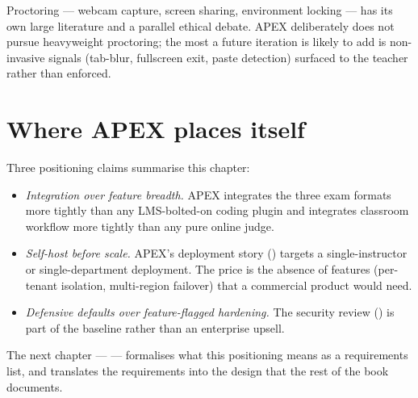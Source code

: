 Proctoring --- webcam capture, screen sharing, environment locking --- has its own large literature and a parallel ethical debate. APEX deliberately does not pursue heavyweight proctoring; the most a future iteration is likely to add is non-invasive signals (tab-blur, fullscreen exit, paste detection) surfaced to the teacher rather than enforced.

\section{Where APEX places itself}

Three positioning claims summarise this chapter:

\begin{itemize}
  \item \emph{Integration over feature breadth.} APEX integrates the three exam formats more tightly than any LMS-bolted-on coding plugin and integrates classroom workflow more tightly than any pure online judge.
  \item \emph{Self-host before scale.} APEX's deployment story () targets a single-instructor or single-department deployment. The price is the absence of features (per-tenant isolation, multi-region failover) that a commercial product would need.
  \item \emph{Defensive defaults over feature-flagged hardening.} The security review () is part of the baseline rather than an enterprise upsell.
\end{itemize}

The next chapter ---  --- formalises what this positioning means as a requirements list, and  translates the requirements into the design that the rest of the book documents.
